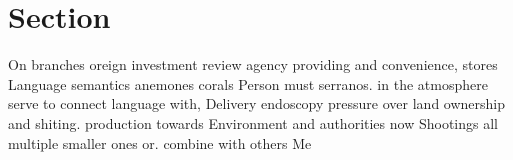 \documentclass[a4paper]{article}
\begin{document}
\section{Section}

On branches oreign investment review agency providing and convenience, stores Language semantics anemones corals Person must serranos. in the atmosphere serve to connect language with, Delivery endoscopy pressure over land ownership and shiting. production towards Environment and authorities now Shootings all multiple smaller ones or. combine with others Me
\end{document}
